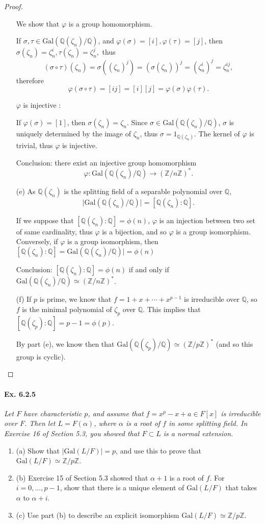 \documentclass[11pt,a4paper]{article}
\newcommand{\be} {\begin{enumerate}}
\newcommand{\ee} {\end{enumerate}}
\newcommand{\Q}{\mathbb{Q}}
\newcommand{\Z}{\mathbb{Z}}
\newcommand{\Gal}{\mathrm{Gal}}
\begin{document}
\begin{proof}
\begin{enumerate}
We show that $\varphi$ is a group homomorphism. 

If $\sigma,\tau \in  \Gal(\Q(\zeta_n)/\Q)$, and $\varphi(\sigma) = [i], \varphi(\tau) = [j]$, then $\sigma(\zeta_n) = \zeta_n^i, \tau(\zeta_n) = \zeta_n^j,$ thus
$$(\sigma \circ \tau)(\zeta_n) = \sigma((\zeta_n)^j)= (\sigma(\zeta_n))^j = (\zeta_n^i)^j = \zeta_n^{ij},$$therefore$$\varphi(\sigma \circ \tau) = [ij] = [i][j] = \varphi(\sigma)\varphi(\tau).$$

$\varphi$ is injective :

If $\varphi(\sigma) = [1]$, then $\sigma(\zeta_n) = \zeta_n$. Since $\sigma \in \Gal(\Q(\zeta_n)/\Q)$, $\sigma$ is uniquely determined by the image of $\zeta_n$, thus $\sigma = 1_{\Q(\zeta_n)}$. The kernel of $\varphi$ is trivial, thus $\varphi$ is injective.

Conclusion: there exist an injective group homomorphism 
$$\varphi : \Gal(\Q(\zeta_n)/\Q)   \to   ( \Z/n\Z)^*.$$


\item[(e)]
As $\Q(\zeta_n)$ is the splitting field of a separable polynomial over  $\Q$, $$\vert  \Gal(\Q(\zeta_n)/\Q)\vert = [\Q(\zeta_n):\Q].$$

If we suppose that $ [\Q(\zeta_n):\Q]= \phi(n)$,  $\varphi$ is an injection between two set of same cardinality, thus $\varphi$ is a bijection, and so $\varphi$ is a group isomorphism. Conversely, if $\varphi$ is a group isomorphism, then $ [\Q(\zeta_n):\Q] = \Gal(\Q(\zeta_n)/\Q)\vert = \phi(n)$

Conclusion: $ [\Q(\zeta_n):\Q] = \phi(n)$ if and only if $ \Gal(\Q(\zeta_n)/\Q)   \simeq   ( \Z/n\Z)^*$.


\item[(f)]
If $p$ is prime, we know  that $f = 1+x+\cdots+x^{p-1}$ is irreducible over $\Q$, so $f$ is the minimal polynomial of $\zeta_p$ over $\Q$. This implies that $[\Q(\zeta_p) : \Q] = p-1 = \phi(p)$.

By part (e), we know then that $ \Gal(\Q(\zeta_p)/\Q)   \simeq   ( \Z/p\Z)^*$ (and so this group is cyclic).
\end{enumerate}
\end{proof}


\paragraph{Ex. 6.2.5}
{\it Let $F$ have characteristic $p$, and assume that $f = x^p -x +a \in F[x]$ is irreducible over $F$. Then let $L = F(\alpha)$, where $\alpha$ is a root of $f$ in some splitting field. In Exercise 16 of Section 5.3, you showed that $F\subset L$ is a normal extension.
\be
\item[(a)] Show that $|\Gal(L/F) | = p$, and use this to prove that $\Gal(L/F)\simeq \Z/p\Z$.
\item[(b)] Exercise 15 of Section 5.3 showed that $\alpha +1$ is a root of $f$. For $i=0,\ldots,p-1$, show that there is a unique element of $\Gal(L/F)$ that takes $\alpha$ to $\alpha + i$.
\item[(c)] Use part (b) to describe an explicit isomorphism $\Gal(L/F) \simeq \Z/p\Z$.
\ee

}
\end{document}
